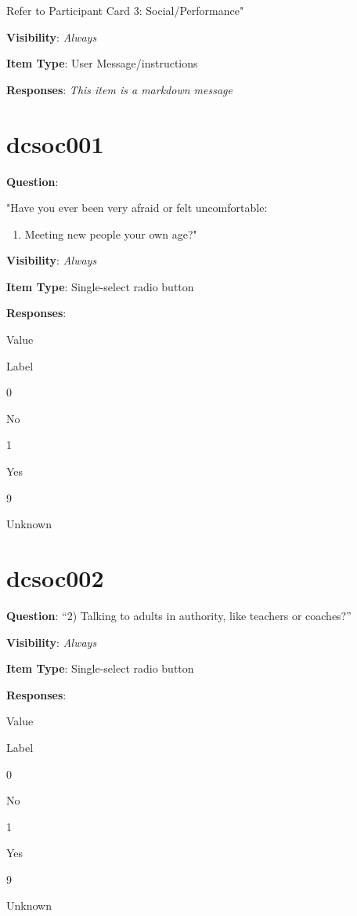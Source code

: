 \documentclass[]{book}
\providecommand{\tightlist}{%
  \setlength{\itemsep}{0pt}\setlength{\parskip}{0pt}}
\begin{document}
Refer to Participant Card 3: Social/Performance"

\textbf{Visibility}: \emph{Always}

\textbf{Item Type}: User Message/instructions

\textbf{Responses}: \emph{This item is a markdown message}

\hypertarget{dcsoc001}{%
\section{dcsoc001}\label{dcsoc001}}

\textbf{Question}:

"Have you ever been very afraid or felt uncomfortable:

\begin{enumerate}
\def\labelenumi{\arabic{enumi})}
\tightlist
\item
  Meeting new people your own age?"
\end{enumerate}

\textbf{Visibility}: \emph{Always}

\textbf{Item Type}: Single-select radio button

\textbf{Responses}:

Value

Label

0

No

1

Yes

9

Unknown

\hypertarget{dcsoc002}{%
\section{dcsoc002}\label{dcsoc002}}

\textbf{Question}: ``2) Talking to adults in authority, like teachers or coaches?''

\textbf{Visibility}: \emph{Always}

\textbf{Item Type}: Single-select radio button

\textbf{Responses}:

Value

Label

0

No

1

Yes

9

Unknown
\end{document}
